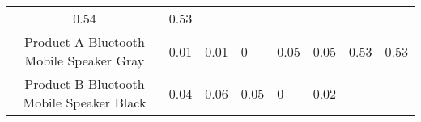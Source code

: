 \documentclass[]{article}
\begin{document}
\begin{longtable}[]{@{}ccllllll@{}}
\begin{minipage}[t]{0.05\columnwidth}
0.54\strut
\end{minipage} & \begin{minipage}[t]{0.05\columnwidth}\raggedright\strut
0.53\strut
\end{minipage}\tabularnewline
\begin{minipage}[t]{0.36\columnwidth}\centering\strut
Product A Bluetooth Mobile Speaker Gray\strut
\end{minipage} & \begin{minipage}[t]{0.05\columnwidth}\centering\strut
0.01\strut
\end{minipage} & \begin{minipage}[t]{0.05\columnwidth}\raggedright\strut
0.01\strut
\end{minipage} & \begin{minipage}[t]{0.05\columnwidth}\raggedright\strut
0\strut
\end{minipage} & \begin{minipage}[t]{0.05\columnwidth}\raggedright\strut
0.05\strut
\end{minipage} & \begin{minipage}[t]{0.05\columnwidth}\raggedright\strut
0.05\strut
\end{minipage} & \begin{minipage}[t]{0.05\columnwidth}\raggedright\strut
0.53\strut
\end{minipage} & \begin{minipage}[t]{0.05\columnwidth}\raggedright\strut
0.53\strut
\end{minipage}\tabularnewline
\begin{minipage}[t]{0.36\columnwidth}\centering\strut
Product B Bluetooth Mobile Speaker Black\strut
\end{minipage} & \begin{minipage}[t]{0.05\columnwidth}\centering\strut
0.04\strut
\end{minipage} & \begin{minipage}[t]{0.05\columnwidth}\raggedright\strut
0.06\strut
\end{minipage} & \begin{minipage}[t]{0.05\columnwidth}\raggedright\strut
0.05\strut
\end{minipage} & \begin{minipage}[t]{0.05\columnwidth}\raggedright\strut
0\strut
\end{minipage} & \begin{minipage}[t]{0.05\columnwidth}\raggedright\strut
0.02\strut
\end{minipage} & \begin{minipage}[t]{0.05\columnwidth}\raggedright\strut

\end{minipage}
\end{longtable}
\end{document}
